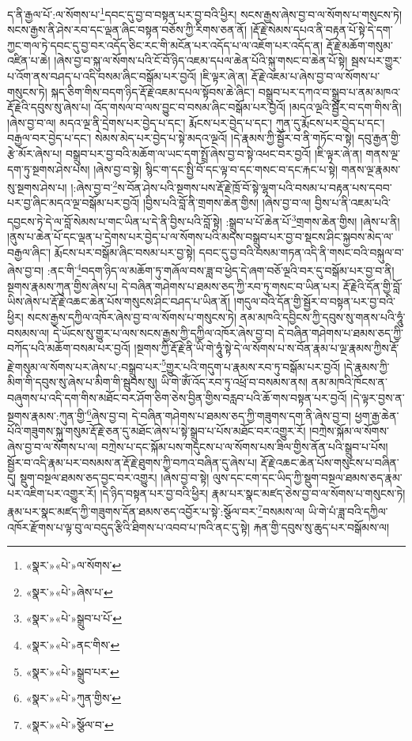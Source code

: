 ད་ནི་རྒྱལ་པོ་:ལ་སོགས་པ་\footnote{«སྣར་»«པེ་»ལ་སོགས་}དབང་དུ་བྱ་བ་བསྟན་པར་བྱ་བའི་ཕྱིར། སངས་རྒྱས་ཞེས་བྱ་བ་ལ་སོགས་པ་གསུངས་ཏེ། སངས་རྒྱས་ནི་ཤེས་རབ་དང་ལྡན་ཞིང་བསྟན་བཅོས་ཀྱི་རིགས་ཅན་ནོ། །རྡོ་རྗེ་སེམས་དཔའ་ནི་བརྟན་པོ་སྟེ་དེ་དག་ཀྱང་གལ་ཏེ་དབང་དུ་བྱ་བར་འདོད་ཅིང་རང་གི་མངོན་པར་འདོད་པ་ལ་འཇོག་པར་འདོད་ན། རྡོ་རྗེ་མཆོག་གསུམ་འཛིན་པ་ཆེ། །ཞེས་བྱ་བ་སྐུ་ལ་སོགས་པའི་ངོ་བོ་ཉིད་འཇམ་དཔལ་ཆེན་པོའི་སྐུ་གསང་བ་ཆེན་པོ་སྟེ། སྦས་པར་གྱུར་པ་འོག་ནས་བཤད་པ་འདི་བསམ་ཞིང་བསྒོམ་པར་བྱའོ། །ཇི་ལྟར་ཞེ་ན། རྡོ་རྗེ་འཇམ་པ་ཞེས་བྱ་བ་ལ་སོགས་པ་གསུངས་ཏེ། སྐད་ཅིག་གིས་བདག་ཉིད་རྡོ་རྗེ་འཇམ་དཔལ་སྟོབས་ཆེ་ཞིང་། བསྒྲུབ་པར་དཀའ་བ་སྒྲུབ་པ་ནམ་མཁའ་རྡོ་རྗེའི་དབུས་སུ་ཞེས་པ། འོད་གསལ་བ་ལས་བྱུང་བ་བསམ་ཞིང་བསྒོམ་པར་བྱའོ། །མདའ་ལྔའི་སྦྱོར་བ་དག་གིས་ནི། །ཞེས་བྱ་བ་ལ། མདའ་ལྔ་ནི་དྲེགས་པར་བྱེད་པ་དང་། རྨོངས་པར་བྱེད་པ་དང་། ཀུན་དུ་རྨོངས་པར་བྱེད་པ་དང་། བརྒྱལ་བར་བྱེད་པ་དང་། སེམས་མེད་པར་བྱེད་པ་སྟེ་མདའ་ལྔའོ། །དེ་རྣམས་ཀྱི་སྦྱོར་བ་ནི་གཏོང་བ་སྟེ། དབུ་རྒྱན་གྱི་རྩེ་མོར་ཞེས་པ། བསྒྲུབ་པར་བྱ་བའི་མཆོག་ལ་ཡང་དག་སྤྲོ་ཞེས་བྱ་བ་སྟེ་འཕང་བར་བྱའོ། །ཇི་ལྟར་ཞེ་ན། གནས་ལྔ་དག་ཏུ་སྔགས་ཤེས་པས། །ཞེས་བྱ་བ་སྟེ། སྙིང་ག་དང་སྤྱི་བོ་དང་ལྟ་བ་དང་གསང་བ་དང་རྐང་པ་སྟེ། གནས་ལྔ་རྣམས་སུ་སྔགས་ཤེས་པ། །:ཞེས་བྱ་བ་\footnote{«སྣར་»«པེ་»ཞེས་པ་}ས་བོན་ཤེས་པའི་སྔགས་པས་རྡོ་རྗེ་ཁྲོ་བོ་སྟེ་ལྷག་པའི་བསམ་པ་བརྟན་པས་དབབ་པར་བྱ་ཞིང་མདའ་ལྔ་བསྒོམ་པར་བྱའོ། །བྱིས་པའི་བློ་ནི་གྲགས་ཆེན་གྱིས། །ཞེས་བྱ་བ་ལ། བྱིས་པ་ནི་འཇམ་པའི་དབྱངས་ཏེ་དེ་ལ་བློ་སེམས་པ་གང་ཡིན་པ་དེ་ནི་བྱིས་པའི་བློ་སྟེ། :སྒྲུབ་པ་པོ་ཆེན་པོ་\footnote{«སྣར་»«པེ་»སྒྲུབ་པ་པོ་}གྲགས་ཆེན་གྱིས། །ཞེས་པ་ནི། །ནུས་པ་ཆེན་པོ་དང་ལྡན་པ་དྲེགས་པར་བྱེད་པ་ལ་སོགས་པའི་མདས་བསྒྲུབ་པར་བྱ་བ་སྡངས་ཤིང་སྐྱབས་མེད་ལ་བརྒྱལ་ཞིང་། རྨོངས་པར་བསྒོམ་ཞིང་བསམ་པར་བྱ་སྟེ། དབང་དུ་བྱ་བའི་བསམ་གཏན་འདི་ནི་གསང་བའི་བསྐུལ་བ་ཞེས་བྱ་བ། :ནང་གི་\footnote{«སྣར་»«པེ་»ནང་གིས་}བདག་ཉིད་ལ་མཆོག་ཏུ་གཞོལ་བས་ཟླ་བ་ཕྱེད་དེ་ཞག་བཅོ་ལྔའི་བར་དུ་བསྒོམ་པར་བྱ་བ་ནི། སྔགས་རྣམས་ཀུན་གྱིས་ཞེས་པ། དེ་བཞིན་གཤེགས་པ་ཐམས་ཅད་ཀྱི་རབ་ཏུ་གསང་བ་ཡིན་པར། རྡོ་རྗེའི་དོན་གྱི་བློ་ཡིས་ཞེས་པ་རྡོ་རྗེ་འཆང་ཆེན་པོས་གསུངས་ཤིང་བཤད་པ་ཡིན་ནོ། །གདུལ་བའི་དོན་གྱི་སྦྱོར་བ་བསྟན་པར་བྱ་བའི་ཕྱིར། སངས་རྒྱས་དཀྱིལ་འཁོར་ཞེས་བྱ་བ་ལ་སོགས་པ་གསུངས་ཏེ། ནམ་མཁའི་དབྱིངས་ཀྱི་དབུས་སུ་གནས་པའི་ཧཱུཾ་བསམས་ལ། དེ་ཡོངས་སུ་གྱུར་པ་ལས་སངས་རྒྱས་ཀྱི་དཀྱིལ་འཁོར་ཞེས་བྱ་བ། དེ་བཞིན་གཤེགས་པ་ཐམས་ཅད་ཀྱི་བཀོད་པའི་མཆོག་བསམ་པར་བྱའོ། །སྔགས་ཀྱི་རྡོ་རྗེ་ནི་ཡི་གེ་ཧཱུཾ་སྟེ་དེ་ལ་སོགས་པ་ས་བོན་རྣམ་པ་ལྔ་རྣམས་ཀྱིས་རྡོ་རྗེ་གསུམ་ལ་སོགས་པར་ཞེས་པ་:བསྒྲུབ་པར་\footnote{«སྣར་»«པེ་»སྒྲུབ་པར་}གྱུར་པའི་གདུག་པ་རྣམས་རབ་ཏུ་བསྒོམ་པར་བྱའོ། །དེ་རྣམས་ཀྱི་མིག་གི་དབུས་སུ་ཞེས་པ་མིག་གི་སྦུབས་སུ། ཡི་གེ་ཨོཾ་འོད་རབ་ཏུ་འཕྲོ་བ་བསམས་ནས། ནམ་མཁའི་ཁོངས་ན་བཞུགས་པ་འདི་དག་གིས་མཐོང་བར་ཤོག་ཅིག་ཅེས་བྱིན་གྱིས་བརླབ་པའི་ཆོ་གས་བསྟན་པར་བྱའོ། །དེ་ལྟར་བྱས་ན་སྔགས་རྣམས་:ཀུན་གྱི་\footnote{«སྣར་»«པེ་»ཀུན་གྱིས་}ཞེས་བྱ་བ། དེ་བཞིན་གཤེགས་པ་ཐམས་ཅད་ཀྱི་གཟུགས་དག་ནི་ཞེས་བྱ་བ། ཕྱག་རྒྱ་ཆེན་པོའི་གཟུགས་སྐུ་གསུམ་རྡོ་རྗེ་ཅན་དུ་མཐོང་ཞེས་པ་སྟེ་སྒྲུབ་པ་པོས་མཐོང་བར་འགྱུར་རོ། །བཀྲེས་སྐོམ་ལ་སོགས་ཞེས་བྱ་བ་ལ་སོགས་པ་ལ། བཀྲེས་པ་དང་སྐོམ་པས་གདུངས་པ་ལ་སོགས་པས་ཟིལ་གྱིས་ནོན་པའི་སྒྲུབ་པ་པོས། སྦྱོར་བ་འདི་རྣམ་པར་བསམས་ན་རྡོ་རྗེ་ཐུགས་ཀྱི་བཀའ་བཞིན་དུ་ཞེས་པ། རྡོ་རྗེ་འཆང་ཆེན་པོས་གསུངས་པ་བཞིན་དུ། སྡུག་བསྔལ་ཐམས་ཅད་བྱང་བར་འགྱུར། །ཞེས་བྱ་བ་སྟེ། ལུས་དང་ངག་དང་ཡིད་ཀྱི་སྡུག་བསྔལ་ཐམས་ཅད་རྣམ་པར་འཇིག་པར་འགྱུར་རོ། །དེ་ཉིད་བསྟན་པར་བྱ་བའི་ཕྱིར། རྣམ་པར་སྣང་མཛད་ཅེས་བྱ་བ་ལ་སོགས་པ་གསུངས་ཏེ། རྣམ་པར་སྣང་མཛད་ཀྱི་གཟུགས་དོན་ཐམས་ཅད་འབྱོར་པ་སྟེ་:སྩོལ་བར་\footnote{«སྣར་»«པེ་»སྩོལ་བ་}བསམས་ལ། ཡི་གེ་པཾ་ཟླ་བའི་དཀྱིལ་འཁོར་རྫོགས་པ་ལྟ་བུ་ལ་བདུད་རྩིའི་ཐིགས་པ་འབབ་པ་ཁའི་ནང་དུ་སྟེ། རྐན་གྱི་དབུས་སུ་ཆུད་པར་བསྒོམས་ལ། 